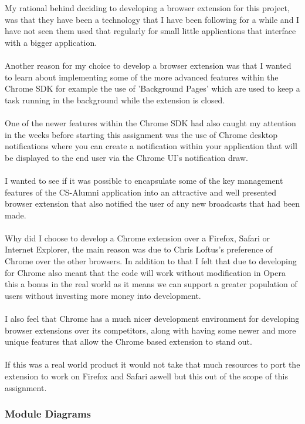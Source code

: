 \documentclass{article}
\begin{document}
My rational behind deciding to developing a browser extension for this project, was that they have been a technology that I have been following for a while and I have not seen them used that regularly for small little applications that interface with a bigger application.\\
\\
Another reason for my choice to develop a browser extension was that I wanted to learn about implementing some of the more advanced features within the Chrome SDK for example the use of 'Background Pages' which are used to keep a task running in the background while the extension is closed.\\
\\
One of the newer features within the Chrome SDK had also caught my attention in the weeks before starting this assignment was the use of Chrome desktop notifications where you can create a notification within your application that will be displayed to the end user via the Chrome UI's notification draw.\\
\\
I wanted to see if it was possible to encapsulate some of the key management features of the CS-Alumni application into an attractive and well presented browser extension that also notified the user of any new broadcasts that had been made.\\
\\
Why did I choose to develop a Chrome extension over a Firefox, Safari or Internet Explorer, the main reason was due to Chris Loftus's preference of Chrome over the other browsers. In addition to that I felt that due to developing for Chrome also meant that the code will work without modification in Opera this a bonus in the real world as it means we can support a greater population of users without investing more money into development.\\
\\
I also feel that Chrome has a much nicer development environment for developing browser extensions over its competitors, along with having some newer and more unique features that allow the Chrome based extension to stand out.\\
\\
If this was a real world product it would not take that much resources to port the extension to work on Firefox and Safari aswell but this out of the scope of this assignment.

\newpage
\subsubsection{Module Diagrams}
\end{document}
